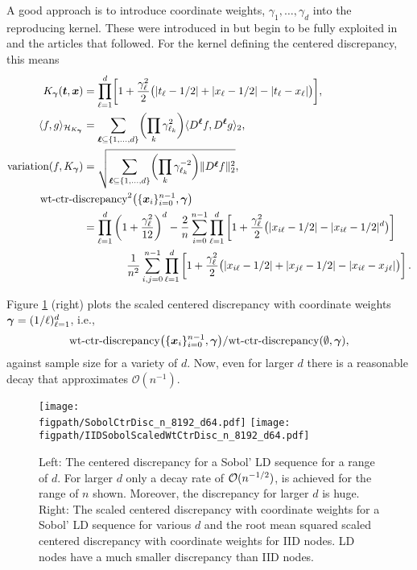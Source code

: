 \documentclass{svproc}
\newcommand{\figpath}{Figures}
\begin{document}
A good approach is to introduce coordinate weights, $\gamma_1, \ldots, \gamma_d$ into the reproducing kernel.  These were introduced in \cite{Hic95} but begin to be fully exploited in \cite{SloWoz98} and the articles that followed.  For the kernel defining the centered discrepancy, this means
\begin{align} \label{eq:wtctrkernel}
	K_{\bsgamma}(\bst,\bsx) &= \prod_{\ell = 1}^d \biggl [ 1 + \frac {\gamma_\ell^2}2 \bigl ( \lvert t_\ell - 1/2 \rvert + \lvert x_\ell - 1/2 \rvert - \lvert t_\ell - x_\ell \rvert \bigr ) \biggr] , \\
	\langle f, g \rangle_{\calH_{K_{\bsgamma}}}  &= \sum_{\bsell \subseteq \{1, \ldots, d\}} \biggl(\prod_k \gamma_{\ell_k}^2 \biggr) \langle D^{\bsell}f, D^{\bsell}g \rangle_2, \\
    \label{eq:wtctrvariation}
	\text{variation}(f,K_{\bsgamma})  &= \sqrt{\sum_{\bsell \subseteq \{1, \ldots, d\}} \biggl( \prod_k \gamma_{\ell_k}^{-2} \biggr) \lVert D^{\bsell}f \rVert_2^2}, \\
	\label{eq:wt-ctrdisc}
	\nonumber
	\MoveEqLeft[4]\text{wt-ctr-discrepancy}^2\bigl(\{ \bsx_i\}_{i=0}^{n-1} , \bsgamma\bigr) \\
	\nonumber
	&= \prod_{\ell=1}^d \left ( 1 + \frac{\gamma_{\ell}^2}{12} \right )^d
	- \frac 2n \sum_{i=0}^{n-1} \prod_{\ell=1}^d \left [ 1 + \frac {\gamma_{\ell}^2}2 \bigl ( \lvert x_{i\ell} - 1/2 \rvert - \lvert x_{i\ell} - 1/2 \rvert^d \bigr )\right ] \\
	& \qquad \qquad \frac{1}{n^2} \sum_{i,j=0}^{n-1} \prod_{\ell = 1}^d \left[ 1 + \frac {\gamma_{\ell}^2}2 \bigl ( \lvert x_{i\ell} - 1/2 \rvert + \lvert x_{j\ell} - 1/2 \rvert - \lvert x_{i\ell} - x_{j\ell} \rvert \bigr ) \right].
\end{align}

Figure \ref{fig:scaledweightedcentered} (right) plots the scaled centered discrepancy with coordinate weights ${\boldsymbol{\gamma}} = (1/\ell)_{\ell =1}^d$, i.e., 
\begin{equation*}
    \text{wt-ctr-discrepancy}\bigl(\{ {\boldsymbol{x}}_i\}_{i=0}^{n-1},{\boldsymbol{\gamma}} \bigr)/\text{wt-ctr-discrepancy}(\emptyset,{\boldsymbol{\gamma}} ),
\end{equation*}
against sample size for a variety of $d$.  Now, even for larger $d$ there is a reasonable decay that approximates $\mathcal{O}(n^{-1})$.

\begin{figure}
    \centering
     \texttt{[image: \\figpath/SobolCtrDisc\_n\_8192\_d64.pdf]}
    \texttt{[image: \\figpath/IIDSobolScaledWtCtrDisc\_n\_8192\_d64.pdf]}
    \caption{Left: The centered discrepancy for a Sobol' LD sequence for a range of $d$.  For larger $d$ only a decay rate of ${\mathcal{O}}(n^{-1/2})$, is achieved for the range of $n$ shown.  Moreover, the discrepancy for larger $d$ is huge.
    Right:
    The scaled centered discrepancy with coordinate weights for a Sobol' LD sequence for various $d$ and the root mean squared scaled centered discrepancy with coordinate weights for IID nodes.  LD nodes have a much smaller discrepancy than IID nodes.}
    \label{fig:scaledweightedcentered}
\end{figure}
\end{document}
